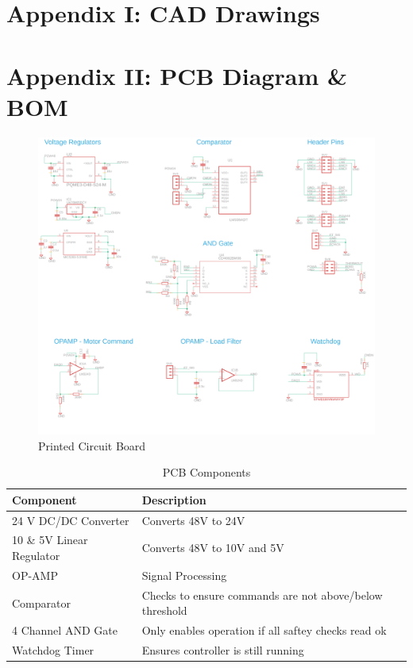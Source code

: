\documentclass[12pt]{report}
\begin{document}
	
\chapter*{Appendix I: CAD Drawings}
\chapter*{Appendix II: PCB Diagram \& BOM}

		
	\begin{figure}[t] 
		\centering
		\includegraphics[width=\linewidth]{pcb_schematic}
		\caption{Printed Circuit Board}
		\label{fig:pcb}
	\end{figure}

	\begin{table}[]
	\centering
	\caption{PCB Components}	
	\begin{tabular}{|l|l|}
		\hline
		\textbf{Component} & \textbf{Description}  \\ \hline
		24 V DC/DC Converter & Converts 48V to 24V  \\ \hline
		10 \& 5V Linear Regulator & Converts 48V to 10V and 5V  \\ \hline
		OP-AMP & Signal Processing   \\ \hline
		Comparator & Checks to ensure commands are not above/below threshold   \\ \hline
		4 Channel AND Gate & Only enables operation if all saftey checks read ok   \\ \hline
		Watchdog Timer & Ensures controller is still running \\ \hline

		\end{tabular}
	\label{tab:belt}
	\end{table}
\end{document}
